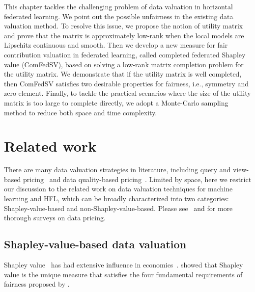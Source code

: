 This chapter tackles the challenging problem of data valuation in horizontal federated learning. We point out the possible unfairness in the existing data valuation method. To resolve this issue, we propose the notion of utility matrix and prove that the matrix is approximately low-rank when the local models are Lipschitz continuous and smooth. Then we develop a new measure for fair contribution valuation in federated learning, called completed federated Shapley value (ComFedSV), based on solving a low-rank matrix completion problem for the utility matrix. We demonstrate that if the utility matrix is well completed, then ComFedSV satisfies two desirable properties for fairness, i.e., symmetry and zero element. Finally, to tackle the practical scenarios where the size of the utility matrix is too large to complete directly, we adopt a Monte-Carlo sampling method to reduce both space and time complexity.

\section{Related work} \label{sec:7-2}
There are many data valuation strategies in literature, including query and view-based pricing~\citep{koutris2015query, koutris2012querymarket, koutris2013toward} and data quality-based pricing~\citep{heckman2015pricing, pipino2002data}. Limited by space, here we restrict our discussion to the related work on data valuation techniques for machine learning and HFL, which can be broadly characterized into two categories: Shapley-value-based and non-Shapley-value-based. Please see~\citep{pei2020survey} and \citep{cong2021data} for more thorough surveys on data pricing. 

\subsection{Shapley-value-based data valuation}
Shapley value~\citep{shapley201617} has had extensive influence in economics~\cite{gul1989bargaining}. \citet{dubey1975uniqueness} showed that Shapley value is the unique measure that satisfies the four fundamental requirements of fairness proposed by \citet{shapley201617}. 

